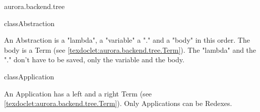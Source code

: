 


\begin{texdocpackage}{aurora.backend.tree}
\label{texdoclet:aurora.backend.tree}

\begin{texdocclass}{class}{Abstraction}
\label{texdoclet:aurora.backend.tree.Abstraction}
\begin{texdocclassintro}
An Abstraction is a "lambda", a "variable" a "." and a "body" in this order.
 The body is a Term (see \ref{texdoclet:aurora.backend.tree.Term}).
 The "lambda" and the "." don't have to be saved, only the variable and the body.\end{texdocclassintro}
\begin{texdocclassfields}
\end{texdocclassfields}
\begin{texdocclassconstructors}
\end{texdocclassconstructors}
\begin{texdocclassmethods}
\end{texdocclassmethods}
\end{texdocclass}


\begin{texdocclass}{class}{Application}
\label{texdoclet:aurora.backend.tree.Application}
\begin{texdocclassintro}
An Application has a left and a right Term (see \ref{texdoclet:aurora.backend.tree.Term}).
 Only Applications can be Redexes.\end{texdocclassintro}
\begin{texdocclassfields}
\end{texdocclassfields}
\begin{texdocclassconstructors}
\end{texdocclassconstructors}
\begin{texdocclassmethods}
\end{texdocclassmethods}
\end{texdocclass}



\end{texdocpackage}
